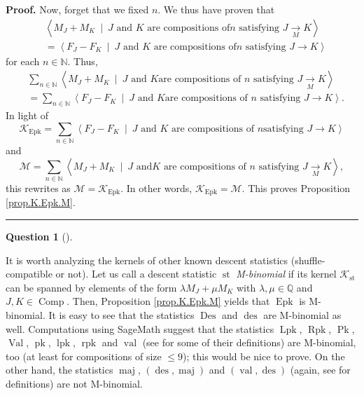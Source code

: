 \documentclass[numbers=enddot,12pt,final,onecolumn,notitlepage]{scrartcl}%
\theoremstyle{definition}
\newtheorem{quest}[theo]{Question}
\newenvironment{question}[1][]
{\begin{quest}[#1]\begin{leftbar}}
{\end{leftbar}\end{quest}}
\newenvironment{proof}[1][Proof]{\noindent\textbf{#1.} }{\ \rule{0.5em}{0.5em}}
\newenvironment{question}[1][Question]{\noindent\textbf{#1.} }{\ \rule{0.5em}{0.5em}}
\newenvironment{verlong}{}{}
\let\sumnonlimits\sum
\renewcommand{\sum}{\sumnonlimits\limits}
\begin{document}
\begin{verlong}
\begin{proof}
Now, forget that we fixed $n$. We thus have proven that
\begin{align*}
&  \left\langle M_{J}+M_{K}\ \mid\ J\text{ and }K\text{ are compositions of
}n\text{ satisfying }J\underset{M}{\rightarrow}K\right\rangle \\
&  =\left\langle F_{J}-F_{K}\ \mid\ J\text{ and }K\text{ are compositions of
}n\text{ satisfying }J\rightarrow K\right\rangle
\end{align*}
for each $n\in\mathbb{N}$. Thus,%
\begin{align*}
&  \sum_{n\in\mathbb{N}}\left\langle M_{J}+M_{K}\ \mid\ J\text{ and }K\text{
are compositions of }n\text{ satisfying }J\underset{M}{\rightarrow
}K\right\rangle \\
&  =\sum_{n\in\mathbb{N}}\left\langle F_{J}-F_{K}\ \mid\ J\text{ and }K\text{
are compositions of }n\text{ satisfying }J\rightarrow K\right\rangle .
\end{align*}
In light of%
\[
\mathcal{K}_{\operatorname*{Epk}}=\sum_{n\in\mathbb{N}}\left\langle
F_{J}-F_{K}\ \mid\ J\text{ and }K\text{ are compositions of }n\text{
satisfying }J\rightarrow K\right\rangle
\]
and%
\[
\mathcal{M}=\sum_{n\in\mathbb{N}}\left\langle M_{J}+M_{K}\ \mid\ J\text{ and
}K\text{ are compositions of }n\text{ satisfying }J\underset{M}{\rightarrow
}K\right\rangle ,
\]
this rewrites as $\mathcal{M}=\mathcal{K}_{\operatorname*{Epk}}$. In other
words, $\mathcal{K}_{\operatorname*{Epk}}=\mathcal{M}$. This proves
Proposition \ref{prop.K.Epk.M}.
\end{proof}
\end{verlong}

\begin{question}
It is worth analyzing the kernels of other known descent statistics
(shuffle-compatible or not).
Let us call a descent statistic $\operatorname{st}$ \textit{M-binomial}
if its kernel $\mathcal{K}_{\operatorname{st}}$ can be spanned by
elements of the form $\lambda M_{J}+\mu M_{K}$ with
$\lambda, \mu \in \mathbb{Q}$ and $J,K\in\operatorname*{Comp}$.
Then, Proposition \ref{prop.K.Epk.M} yields that $\operatorname{Epk}$
is M-binomial.
It is easy to see that the statistics $\operatorname{Des}$ and
$\operatorname{des}$ are M-binomial as well.
Computations using SageMath suggest that the statistics
$\operatorname{Lpk}$, $\operatorname{Rpk}$, $\operatorname{Pk}$,
$\operatorname{Val}$,
$\operatorname{pk}$, $\operatorname{lpk}$, $\operatorname{rpk}$
and $\operatorname{val}$
(see \cite{part1} for some of their definitions) are M-binomial, too
(at least for compositions of size $\leq 9$);
this would be nice to prove.
On the other hand, the statistics
$\operatorname{maj}$, $\left(\operatorname{des},\operatorname{maj}\right)$
and $\left(\operatorname{val},\operatorname{des}\right)$ (again, see
\cite{part1} for definitions) are not M-binomial.
\end{question}
\end{document}
